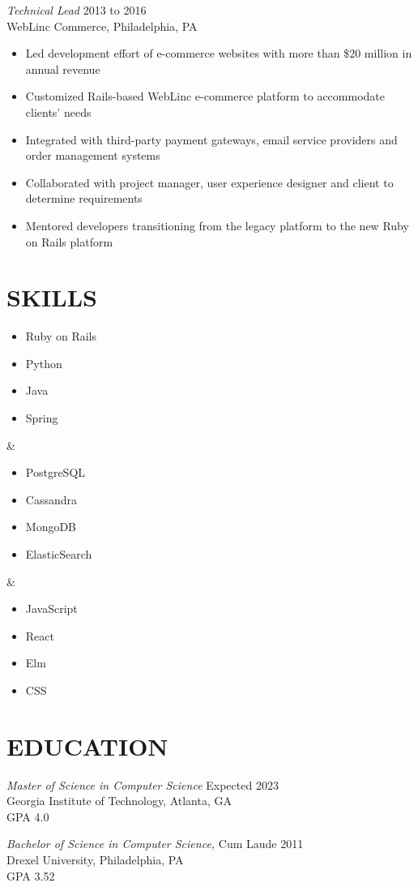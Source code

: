 \documentclass[line]{style}
\begin{document}
\begin{resume}
{\sl Technical Lead} \hfill 2013 to 2016 \\
WebLinc Commerce, Philadelphia, PA
\begin{itemize} \itemsep -2pt
\item Led development effort of e-commerce websites with more than \$20 million in annual revenue
\item Customized Rails-based WebLinc e-commerce platform to accommodate clients' needs
\item Integrated with third-party payment gateways, email service providers and order management systems
\item Collaborated with project manager, user experience designer and client to determine requirements
\item Mentored developers transitioning from the legacy platform to the new Ruby on Rails platform
\end{itemize}

\section{SKILLS}
\begin{ncolumn}{3}
\begin{itemize} \itemsep -2pt
\item Ruby on Rails
\item Python
\item Java
\item Spring
\end{itemize}
&
\begin{itemize} \itemsep -2pt
\item PostgreSQL
\item Cassandra
\item MongoDB
\item ElasticSearch
\end{itemize}
&
\begin{itemize} \itemsep -2pt
\item JavaScript
\item React
\item Elm
\item CSS
\end{itemize}
\end{ncolumn}

\section{EDUCATION}
{\sl Master of Science in Computer Science} \hfill Expected 2023 \\
Georgia Institute of Technology, Atlanta, GA \\
GPA 4.0

{\sl Bachelor of Science in Computer Science,} Cum Laude \hfill 2011 \\
Drexel University, Philadelphia, PA \\
GPA 3.52

\end{resume}
\end{document}
